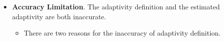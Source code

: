 {\begin{itemize}
 \item \textbf{Accuracy Limitation}.
 The adaptivity definition and the estimated adaptivity are both inaccurate.
    \begin{itemize}
        \item There are two reasons for the inaccuracy of adaptivity definition.

\end{itemize}
\end{itemize}}
